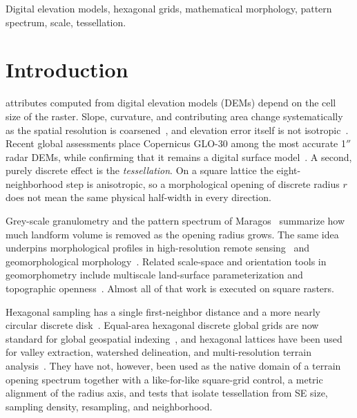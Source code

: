 \documentclass[journal]{IEEEtran}
\begin{document}
\begin{IEEEkeywords}
Digital elevation models, hexagonal grids, mathematical morphology,
pattern spectrum, scale, tessellation.
\end{IEEEkeywords}

\section{Introduction}

 attributes computed from digital elevation models (DEMs) depend on
the cell size of the raster. Slope, curvature, and contributing area change
systematically as the spatial resolution is coarsened~\cite{zhang1994digital,deng2007dem,evans1972general,wood1996scale},
and elevation error itself is not isotropic~\cite{fisher2006causes}.
Recent global assessments place Copernicus GLO-30 among the most accurate
1$''$ radar DEMs, while confirming that it remains a digital surface
model~\cite{guth2021lidar,simard2024global}.
A second, purely discrete effect is the \emph{tessellation}. On a square lattice the
eight-neighborhood step is anisotropic, so a morphological opening of discrete
radius \(r\) does not mean the same physical half-width in every direction.

Grey-scale granulometry and the pattern spectrum of Maragos~\cite{maragos1989pattern,matheron1975random,serra1982image,soille2004morphological}
summarize how much landform volume is removed as the opening radius grows.
The same idea underpins morphological profiles in high-resolution remote
sensing~\cite{pesaresi2001new,dallamura2010morphological,ghamisi2015survey} and
geomorphological morphology~\cite{sagar2013mathematical}.
Related scale-space and orientation tools in geomorphometry include
multiscale land-surface parameterization and topographic
openness~\cite{wood1996scale,schmidt2003comparison,yokoyama2002openness}.
Almost all of that work is executed on square rasters.

Hexagonal sampling has a single first-neighbor distance and a more
nearly circular discrete disk~\cite{mersereau1979processing,middleton2005hexagonal}.
Equal-area hexagonal discrete global grids are now standard
for global geospatial indexing~\cite{sahr2003geodesic,snyder1992equal}, and
hexagonal lattices have been used for valley extraction, watershed
delineation, and multi-resolution terrain analysis~\cite{wang2020isotropic,liao2020watershed,li2022multi}.
They have not, however, been used as the native domain of a terrain opening
spectrum together with a like-for-like square-grid control, a metric
alignment of the radius axis, and tests that isolate tessellation from
SE size, sampling density, resampling, and neighborhood.
\end{document}
